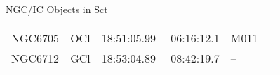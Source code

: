 \begin{block}{NGC/IC Objects in Sct}
  \centering
  \begin{tabularx}{\textwidth}{llrrll} \toprule 
    NGC6705 & OCl & 18:51:05.99 & -06:16:12.1  & M011 \\ 
    NGC6712 & GCl & 18:53:04.89 & -08:42:19.7  & -- \\ 
  \end{tabularx}
\end{block}